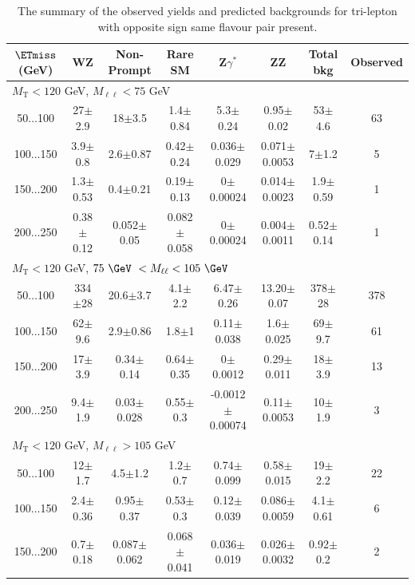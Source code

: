 \begin{landscape}
\begin{table}
\begin{center}
\caption{\label{tab:OSSF1tau0} The summary of the observed yields and predicted backgrounds for tri-lepton with opposite sign same flavour pair present. }
\begin{tabular}{| c | c c c c c c c | }\hline\hline
$\ETmiss$ (GeV) & WZ & Non-Prompt & Rare SM & Z$\gamma^*$ & ZZ & Total bkg & Observed\\\hline\hline
\multicolumn{8}{l}{$M_{\text{T}} < 120$ GeV, $M_{\ell\ell} < 75$ GeV}\\\hline\hline
50$\dots$100&27$\pm$2.9&18$\pm$3.5&1.4$\pm$0.84&5.3$\pm$0.24&0.95$\pm$0.02&53$\pm$4.6&63\\
100$\dots$150&3.9$\pm$0.8&2.6$\pm$0.87&0.42$\pm$0.24&0.036$\pm$0.029&0.071$\pm$0.0053&7$\pm$1.2&5\\
150$\dots$200&1.3$\pm$0.53&0.4$\pm$0.21&0.19$\pm$0.13&0$\pm$0.00024&0.014$\pm$0.0023&1.9$\pm$0.59&1\\
200$\dots$250&0.38$\pm$0.12&0.052$\pm$0.05&0.082$\pm$0.058&0$\pm$0.00024&0.004$\pm$0.0011&0.52$\pm$0.14&1\\
\hline\hline
\multicolumn{8}{l}{$M_{\text{T}} < 120$ GeV, $75~\GeV~< M_{\ell\ell} < 105~\GeV~$}\\\hline\hline
50$\dots$100&334$\pm$28&20.6$\pm$3.7&4.1$\pm$2.2&6.47$\pm$0.26&13.20$\pm$0.07&378$\pm$28&378\\
100$\dots$150&62$\pm$9.6&2.9$\pm$0.86&1.8$\pm$1&0.11$\pm$0.038&1.6$\pm$0.025&69$\pm$9.7&61\\
150$\dots$200&17$\pm$3.9&0.34$\pm$0.14&0.64$\pm$0.35&0$\pm$0.0012&0.29$\pm$0.011&18$\pm$3.9&13\\
200$\dots$250&9.4$\pm$1.9&0.03$\pm$0.028&0.55$\pm$0.3&-0.0012$\pm$0.00074&0.11$\pm$0.0053&10$\pm$1.9&3\\
\hline\hline
\multicolumn{8}{l}{$M_{\text{T}} < 120$ GeV, $M_{\ell\ell} > 105$ GeV}\\\hline\hline
50$\dots$100&12$\pm$1.7&4.5$\pm$1.2&1.2$\pm$0.7&0.74$\pm$0.099&0.58$\pm$0.015&19$\pm$2.2&22\\
100$\dots$150&2.4$\pm$0.36&0.95$\pm$0.37&0.53$\pm$0.3&0.12$\pm$0.039&0.086$\pm$0.0059&4.1$\pm$0.61&6\\
150$\dots$200&0.7$\pm$0.18&0.087$\pm$0.062&0.068$\pm$0.041&0.036$\pm$0.019&0.026$\pm$0.0032&0.92$\pm$0.2&2\\

\end{tabular}
\end{center}
\end{table}
\end{landscape}
